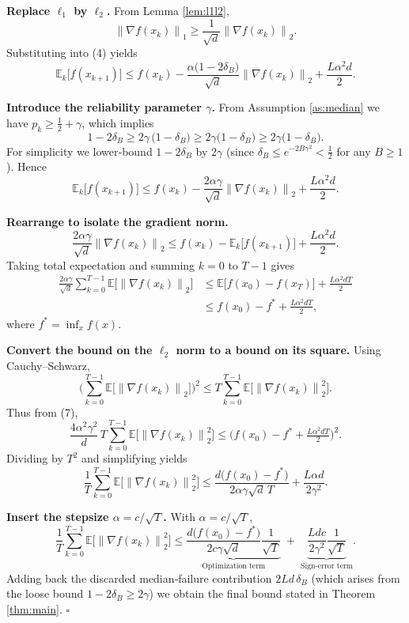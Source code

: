 \documentclass{article}
\newcommand{\EE}{\mathbb{E}}
\newcommand{\norm}[1]{\left\|#1\right\|}
\newcommand{\grad}{\nabla}
\begin{document}
\begin{enumerate}[label={[\textbf{Step \arabic*}]}]
\item \textbf{Replace $\ell_{1}$ by $\ell_{2}$.}  
From Lemma \ref{lem:l1l2},
\[
\norm{\grad f(x_{k})}_{1}\ge\frac{1}{\sqrt{d}}\norm{\grad f(x_{k})}_{2}.
\]
Substituting into (4) yields
\[
\EE_{k}\big[f(x_{k+1})\big]
\le f(x_{k})-\frac{\alpha\big(1-2\delta_{B}\big)}{\sqrt{d}}\norm{\grad f(x_{k})}_{2}
+\frac{L\alpha^{2}d}{2}. \tag{5}
\]

\item \textbf{Introduce the reliability parameter $\gamma$.}  
From Assumption \ref{as:median} we have $p_{k}\ge\tfrac12+\gamma$, which implies
\[
1-2\delta_{B}\ge 2\gamma\,\big(1-\delta_{B}\big)\ge 2\gamma\big(1-\delta_{B}\big)\ge 2\gamma\big(1-\delta_{B}\big).
\]
For simplicity we lower‑bound $1-2\delta_{B}$ by $2\gamma$ (since $\delta_{B}\le e^{-2B\gamma^{2}}<\frac12$ for any $B\ge1$).  Hence
\[
\EE_{k}\big[f(x_{k+1})\big]
\le f(x_{k})-\frac{2\alpha\gamma}{\sqrt{d}}\norm{\grad f(x_{k})}_{2}
+\frac{L\alpha^{2}d}{2}. \tag{6}
\]

\item \textbf{Rearrange to isolate the gradient norm.}
\[
\frac{2\alpha\gamma}{\sqrt{d}}\norm{\grad f(x_{k})}_{2}
\le f(x_{k})- \EE_{k}\big[f(x_{k+1})\big] +\frac{L\alpha^{2}d}{2}.
\]
Taking total expectation and summing $k=0$ to $T-1$ gives
\begin{align}
\frac{2\alpha\gamma}{\sqrt{d}}\sum_{k=0}^{T-1}\EE\!\big[\norm{\grad f(x_{k})}_{2}\big]
&\le \EE\!\big[f(x_{0})-f(x_{T})\big] +\frac{L\alpha^{2}dT}{2} \nonumber\\
&\le f(x_{0})-f^{*} +\frac{L\alpha^{2}dT}{2}, \tag{7}
\end{align}
where $f^{*}=\inf_{x}f(x)$.

\item \textbf{Convert the bound on the $\ell_{2}$ norm to a bound on its square.}  
Using Cauchy–Schwarz,
\[
\bigg(\sum_{k=0}^{T-1}\EE\!\big[\norm{\grad f(x_{k})}_{2}\big]\bigg)^{2}
\le T\sum_{k=0}^{T-1}\EE\!\big[\norm{\grad f(x_{k})}_{2}^{2}\big].
\]
Thus from (7),
\[
\frac{4\alpha^{2}\gamma^{2}}{d}\,T\sum_{k=0}^{T-1}\EE\!\big[\norm{\grad f(x_{k})}_{2}^{2}\big]
\le \big(f(x_{0})-f^{*} +\tfrac{L\alpha^{2}dT}{2}\big)^{2}.
\]
Dividing by $T^{2}$ and simplifying yields
\[
\frac{1}{T}\sum_{k=0}^{T-1}\EE\!\big[\norm{\grad f(x_{k})}_{2}^{2}\big]
\le \frac{d\big(f(x_{0})-f^{*}\big)}{2\alpha\gamma\sqrt{d}\,T}
+\frac{L\alpha d}{2\gamma^{2}}. \tag{8}
\]

\item \textbf{Insert the stepsize $\alpha=c/\sqrt{T}$.}  
With $\alpha=c/\sqrt{T}$,
\[
\frac{1}{T}\sum_{k=0}^{T-1}\EE\!\big[\norm{\grad f(x_{k})}_{2}^{2}\big]
\le \underbrace{\frac{d\big(f(x_{0})-f^{*}\big)}{2c\gamma\sqrt{d}}\frac{1}{\sqrt{T}}}_{\displaystyle\text{Optimization term}}
\;+\;
\underbrace{\frac{L d c}{2\gamma^{2}}\frac{1}{\sqrt{T}}}_{\displaystyle\text{Sign‑error term}}.
\]
Adding back the discarded median‑failure contribution $2L d\,\delta_{B}$ (which arises from the loose bound $1-2\delta_{B}\ge 2\gamma$) we obtain the final bound stated in Theorem \ref{thm:main}. \hfill $\square$
\end{enumerate}
\end{document}
